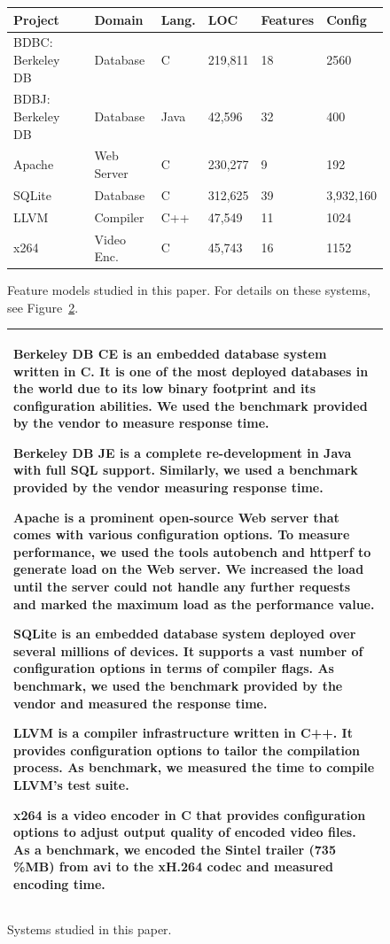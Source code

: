 \documentclass{sig-alternative}
\newcommand{\fig}[1]{Figure~\ref{fig:#1}}
\begin{document}
\begin{figure}[!t]
\scriptsize
\begin{tabular}{llllll}
  \hline
Project & Domain & Lang. & LOC & Features & Config\\\hline
BDBC: Berkeley DB   & Database & C & 219,811 & 18 & 2560\\
BDBJ: Berkeley DB   & Database & Java & 42,596 & 32  & 400\\
Apache & Web Server & C & 230,277 & 9 & 192\\
SQLite & Database & C & 312,625 & 39 & 3,932,160\\
LLVM & Compiler & C++ & 47,549 & 11 & 1024\\
x264 & Video Enc. & C& 45,743 & 16 & 1152\\\hline
\end{tabular}
 \label{fig:subjectsystems}
\caption{Feature models studied in this paper. For details on these systems,
see \fig{systems}.}\label{fig:cpm}
\end{figure}


\begin{figure}\small
\begin{tabular}{|p{.95\linewidth}|}\hline
\textbf{Berkeley DB CE} is an embedded database system written in C. It is one of the most deployed databases in the world due to its low binary footprint and its configuration abilities. We used the benchmark provided by the vendor to measure response time.

\textbf{Berkeley DB JE} is a complete re-development in Java with full SQL support. Similarly, we used a benchmark provided by the vendor measuring response time.

\textbf{Apache} is a prominent open-source Web server that comes with various configuration options. To measure performance, we used the tools autobench and httperf to generate load on the Web server. We increased the load until the server could not handle any further requests and marked the maximum load as the performance value.

\textbf{SQLite} is an embedded database system deployed over several millions of devices. It supports a vast number of configuration options in terms of compiler flags. As benchmark, we used the benchmark provided by the vendor and measured the response time.

\textbf{LLVM} is a compiler infrastructure written in C++. It provides configuration options to tailor the compilation process. As benchmark, we measured the time to compile LLVM's test suite.

\textbf{x264} is a video encoder in C that provides configuration options to adjust output quality of encoded video files. As a benchmark, we encoded the Sintel trailer (735\,\%MB) from avi to the xH.264 codec and measured encoding time.\\\hline
\end{tabular}
\caption{Systems studied in this paper.}\label{fig:systems}
\end{figure}
\end{document}
